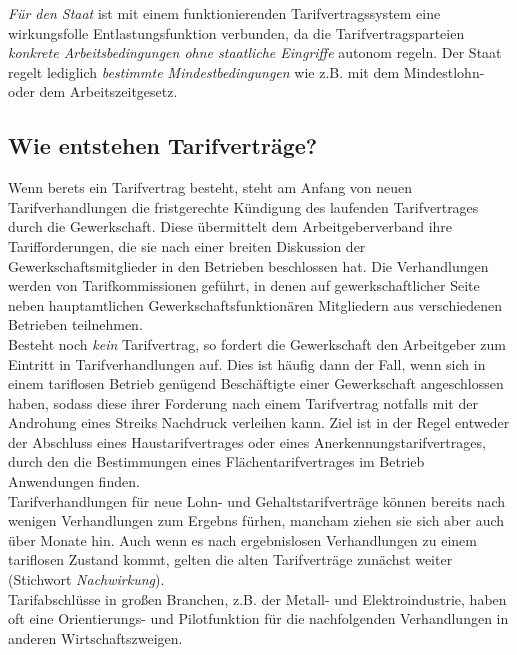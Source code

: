 \documentclass[a4paper, 12pt]{report}
\begin{document}
\emph{Für den Staat} ist mit einem funktionierenden Tarifvertragssystem eine 
wirkungsfolle Entlastungsfunktion verbunden, da die Tarifvertragsparteien 
\emph{konkrete Arbeitsbedingungen ohne staatliche Eingriffe} autonom regeln. 
Der Staat regelt lediglich \emph{bestimmte Mindestbedingungen} wie z.B. 
mit dem Mindestlohn- oder dem Arbeitszeitgesetz. 

\subsection{Wie entstehen Tarifverträge?}

Wenn berets ein Tarifvertrag besteht, steht am Anfang von neuen 
Tarifverhandlungen die fristgerechte Kündigung des laufenden Tarifvertrages 
durch die Gewerkschaft. Diese übermittelt dem Arbeitgeberverband ihre 
Tarifforderungen, die sie nach einer breiten Diskussion der 
Gewerkschaftsmitglieder in den Betrieben beschlossen hat. Die Verhandlungen 
werden von Tarifkommissionen geführt, in denen auf gewerkschaftlicher Seite 
neben hauptamtlichen Gewerkschaftsfunktionären Mitgliedern aus verschiedenen
Betrieben teilnehmen. \\

Besteht noch \emph{kein} Tarifvertrag, so fordert die Gewerkschaft den 
Arbeitgeber zum Eintritt in Tarifverhandlungen auf. Dies ist häufig dann der 
Fall, wenn sich in einem tariflosen Betrieb genügend Beschäftigte einer 
Gewerkschaft angeschlossen haben, sodass diese ihrer Forderung nach einem 
Tarifvertrag notfalls mit der Androhung eines Streiks Nachdruck verleihen kann. 
Ziel ist in der Regel entweder der Abschluss eines Haustarifvertrages oder eines 
Anerkennungstarifvertrages, durch den die Bestimmungen eines 
Flächentarifvertrages im Betrieb Anwendungen finden. \\

Tarifverhandlungen für neue Lohn- und Gehaltstarifverträge können bereits nach
wenigen Verhandlungen zum Ergebns fürhen, mancham ziehen sie sich aber auch über
Monate hin. Auch wenn es nach ergebnislosen Verhandlungen zu einem 
\glqq tariflosen \grqq{} Zustand kommt, gelten die alten Tarifverträge zunächst 
weiter (Stichwort \emph{Nachwirkung}). \\

Tarifabschlüsse in großen Branchen, z.B. der Metall- und Elektroindustrie, haben
oft eine Orientierungs- und Pilotfunktion für die nachfolgenden Verhandlungen in
anderen Wirtschaftszweigen. \\
\end{document}
